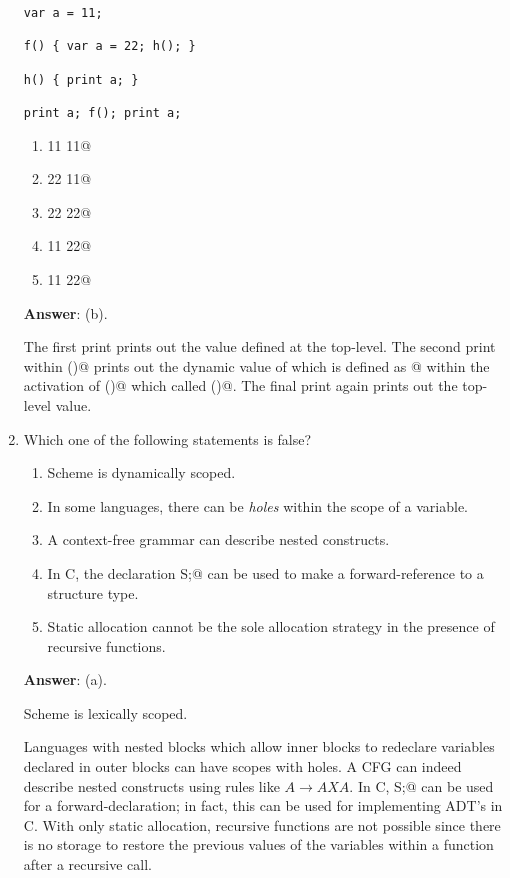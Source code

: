 \documentclass[12pt]{article}
\begin{document}
\begin{enumerate}
\begin{verbatim}
var a = 11;

f() { var a = 22; h(); }

h() { print a; }

print a; f(); print a;
\end{verbatim}

\begin{enumerate}

\item {} 11 11@

\item {} 22 11@

\item {} 22 22@

\item {} 11 22@

\item {} 11 22@
    
\end{enumerate}

\textbf{Answer}: (b).

The first print prints out the value \verb@a@ defined at the
top-level.  The second print within \verb@h()@ prints out the dynamic
value of \verb@a@ which is defined as @ within the activation
of \verb@f()@ which called \verb@h()@.  The final print again
prints out the top-level value.

\item Which one of the following statements is false?

\begin{enumerate}

\item Scheme is dynamically scoped.

\item In some languages, there can be \textit{holes} within the scope
  of a variable.

\item A context-free grammar can describe nested constructs.

\item In C, the declaration \verb@struct S;@ can be used to make a
  forward-reference to a structure type.

\item Static allocation cannot be the sole allocation strategy in
  the presence of recursive functions.

\end{enumerate}

\textbf{Answer}: (a).

Scheme is lexically scoped.

Languages with nested blocks which allow inner blocks to redeclare
variables declared in outer blocks can have scopes with holes.  A CFG
can indeed describe nested constructs using rules like $A\rightarrow
AXA$.  In C, \verb@struct S;@ can be used for a forward-declaration;
in fact, this can be used for implementing ADT's in C.  With only
static allocation, recursive functions are not possible since there is
no storage to restore the previous values of the variables within a
function after a recursive call.

\end{enumerate}
\end{document}
